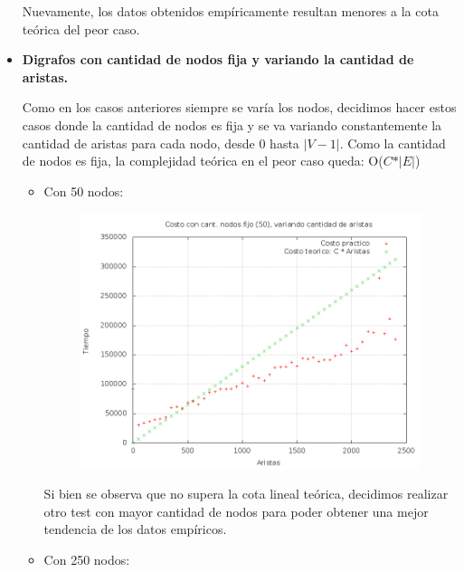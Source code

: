 \begin{itemize}
\quad Nuevamente, los datos obtenidos empíricamente resultan menores a la cota teórica del peor caso.

\item  \textbf{Digrafos con cantidad de nodos fija y variando la cantidad de aristas.}

\quad Como en los casos anteriores siempre se varía los nodos, decidimos hacer estos casos donde la cantidad de nodos es fija y se va variando constantemente la cantidad de aristas para cada nodo, desde 0 hasta $ \vert V - 1 \vert $. Como la cantidad de nodos es fija, la complejidad teórica en el peor caso queda: O($ C * \vert E \vert $)

\begin{itemize}

\item Con 50 nodos:

\begin{figure}[H]
	\centering
	\includegraphics[scale=0.6]{ej3-grafico1.png}
\end{figure}

\quad Si bien se observa que no supera la cota lineal teórica, decidimos realizar otro test con mayor cantidad de nodos para poder obtener una mejor tendencia de los datos empíricos.

\item Con 250 nodos:


\end{itemize}
\end{itemize}
